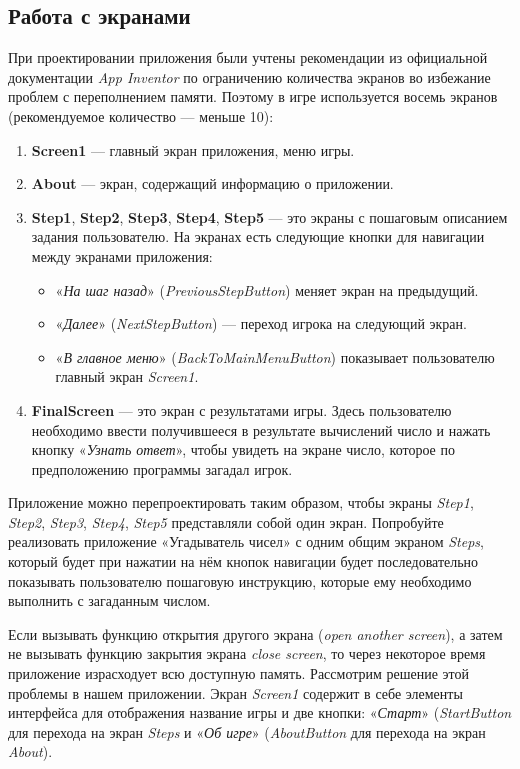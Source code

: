 \subsection{Работа с экранами}
При проектировании приложения были учтены рекомендации из официальной документации \textit{App Inventor}\cite{MitManyScreens} по ограничению количества экранов во избежание проблем с переполнением памяти.
Поэтому в игре используется восемь экранов (рекомендуемое количество — меньше 10):
\begin{enumerate}
\item \textbf{Screen1} — главный экран приложения, меню игры.
\item \textbf{About} — экран, содержащий информацию о приложении.
\item \textbf{Step1}, \textbf{Step2}, \textbf{Step3}, \textbf{Step4}, \textbf{Step5} — это экраны с пошаговым описанием задания пользователю. На экранах есть следующие кнопки для навигации между экранами приложения:
\begin{itemize}
  \item «\textit{На шаг назад}» (\textit{PreviousStepButton}) меняет экран на предыдущий.
  \item «\textit{Далее}» (\textit{NextStepButton}) — переход игрока на следующий экран.
  \item «\textit{В главное меню}» (\textit{BackToMainMenuButton}) показывает пользователю главный экран \textit{Screen1}.
\end{itemize}
\item \textbf{FinalScreen} — это экран с результатами игры. Здесь пользователю необходимо ввести получившееся в результате вычислений число и нажать кнопку «\textit{Узнать ответ}», чтобы увидеть на экране число, которое по предположению программы загадал игрок.
\end{enumerate}

\begin{mdfstyle}[nobreak=true,frametitle=Упражнение]
\sloppy Приложение можно перепроектировать таким образом, чтобы экраны \textit{Step1}, \textit{Step2}, \textit{Step3}, \textit{Step4}, \textit{Step5} представляли собой один экран. Попробуйте реализовать приложение «Угадыватель чисел» с одним общим экраном \textit{Steps}, который будет при нажатии на нём кнопок навигации будет последовательно показывать пользователю пошаговую инструкцию, которые ему необходимо выполнить с загаданным числом.\end{mdfstyle}

Если вызывать функцию открытия другого экрана (\textit{open another screen}), а затем не вызывать функцию закрытия экрана \textit{close screen}, то через некоторое время приложение израсходует всю доступную память.
Рассмотрим решение этой проблемы в нашем приложении. Экран \textit{Screen1} содержит в себе элементы интерфейса для отображения название игры и две кнопки: «\textit{Старт}» (\textit{StartButton} для перехода на экран \textit{Steps} и «\textit{Об игре}» (\textit{AboutButton} для перехода на экран \textit{About}).


